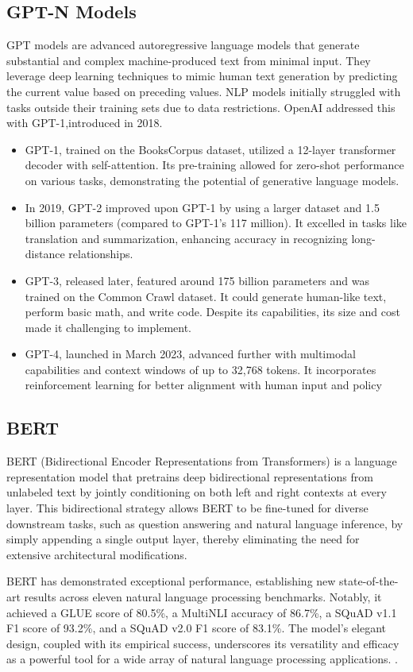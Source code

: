 \subsection{GPT-N Models}
GPT models are advanced autoregressive language models that generate substantial and complex machine-produced text from minimal input. They leverage deep learning techniques to mimic human text generation by predicting the current value based on preceding values.
NLP models initially struggled with tasks outside their training sets due to data restrictions. OpenAI addressed this with GPT-1,introduced in 2018.
\begin{itemize}
	\item GPT-1, trained on the BooksCorpus dataset, utilized a 12-layer transformer decoder with self-attention. Its pre-training allowed for zero-shot performance on various tasks, demonstrating the potential of generative language models.
	\item In 2019, GPT-2 improved upon GPT-1 by using a larger dataset and 1.5 billion parameters (compared to GPT-1’s 117 million). It excelled in tasks like translation and summarization, enhancing accuracy in recognizing long-distance relationships.
	\item GPT-3, released later, featured around 175 billion parameters and was trained on the Common Crawl dataset. It could generate human-like text, perform basic math, and write code. Despite its capabilities, its size and cost made it challenging to implement.
	\item GPT-4, launched in March 2023, advanced further with multimodal capabilities and context windows of up to 32,768 tokens. It incorporates reinforcement learning for better alignment with human input and policy\cite{yenduri2023gpt}
\end{itemize}
\subsection{BERT}
BERT (Bidirectional Encoder Representations from Transformers) is a   language representation model that pretrains deep bidirectional representations from unlabeled text by jointly conditioning on both left and right contexts at every layer. This bidirectional strategy allows BERT to be fine-tuned for diverse downstream tasks, such as question answering and natural language inference, by simply appending a single output layer, thereby eliminating the need for extensive architectural modifications.

BERT has demonstrated exceptional performance, establishing new state-of-the-art results across eleven natural language processing benchmarks. Notably, it achieved a GLUE score of 80.5\%, a MultiNLI accuracy of 86.7\%, a SQuAD v1.1 F1 score of 93.2\%, and a SQuAD v2.0 F1 score of 83.1\%. The model's elegant design, coupled with its empirical success, underscores its versatility and efficacy as a powerful tool for a wide array of natural language processing applications.
\cite{devlin2019bert}.
